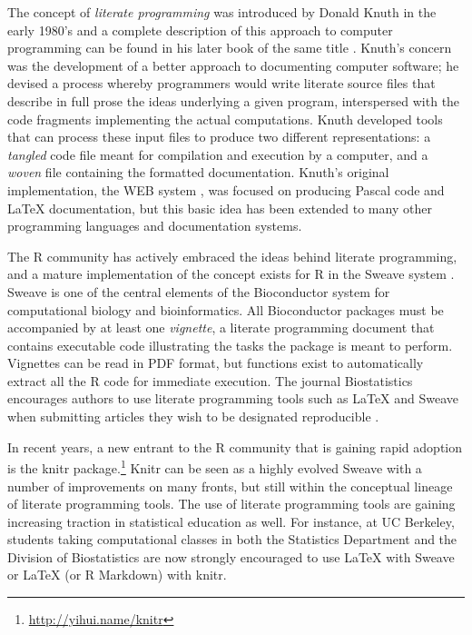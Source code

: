 \documentclass[ChapterTOCs,krantz2]{krantz} %
\begin{document}
The concept of \emph{literate programming} was introduced by Donald Knuth in
the early 1980's and a complete description of this approach to computer
programming can be found in his later book of the same title \cite{Knuth92}.
Knuth's concern was the development of a better approach to documenting
computer software; he devised a process whereby programmers would write
literate source files that describe in full prose the ideas underlying a given
program, interspersed with the code fragments implementing the actual
computations.  Knuth developed tools that can process these input files to
produce two different representations: a \emph{tangled} code file meant for
compilation and execution by a computer, and a \emph{woven} file containing the
formatted documentation.  Knuth's original implementation, the WEB system
\cite{Knuth:1983:WSS}, was focused on producing Pascal code and \LaTeX{}
documentation, but this basic idea has been extended to many other programming
languages and documentation systems.  

The R community has actively embraced the ideas behind literate programming,
and a mature implementation of the concept exists for R in the Sweave system
\cite{lmucs-papers:Leisch:2002}.  Sweave is one of the central elements of the
Bioconductor system \cite{Gentleman2004, Dudoit2003} for computational biology
and bioinformatics.  All Bioconductor packages must be accompanied by at
least one \emph{vignette}, a literate programming document that contains
executable code illustrating the tasks the package is meant to perform.
Vignettes can be read in PDF format, but functions exist to automatically
extract all the R code for immediate execution.  The journal Biostatistics
encourages authors to use literate programming tools such as \LaTeX{} and Sweave
when submitting articles they wish to be designated reproducible \cite{Peng01072009}.

In recent years, a new entrant to the R community that is gaining rapid
adoption is the knitr package.\footnote{\url{http://yihui.name/knitr}}  Knitr can be seen as a
highly evolved Sweave with a number of improvements on many fronts, but still
within the conceptual lineage of literate programming tools.  The use of
literate programming tools are gaining increasing traction in statistical
education as well.  For instance, at UC Berkeley, students taking computational
classes in both the Statistics Department and the Division of Biostatistics are
now strongly encouraged to use \LaTeX{} with Sweave or \LaTeX{} (or R Markdown) with 
knitr.
\end{document}
